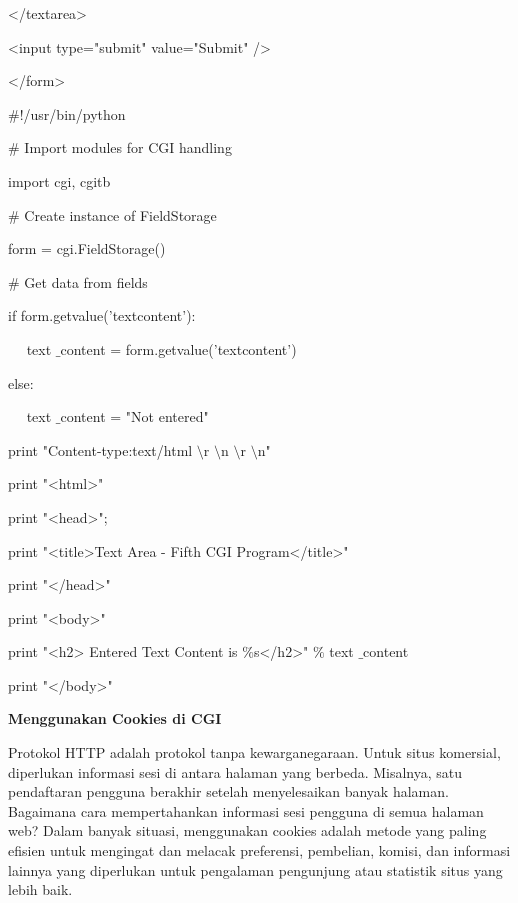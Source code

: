 \noindent 
</textarea> \par
\noindent 
<input type="submit" value="Submit" /> \par
\noindent 
</form> \par
\vspace{12pt}
\noindent 
 $  \#  $!/usr/bin/python \par
\vspace{12pt}
\noindent 
 $  \#  $ Import modules for CGI handling  \par
\noindent 
import cgi, cgitb  \par
\vspace{12pt}
\noindent 
 $  \#  $ Create instance of FieldStorage  \par
\noindent 
form = cgi.FieldStorage()  \par
\vspace{12pt}
\noindent 
 $  \#  $ Get data from fields \par
\noindent 
if form.getvalue('textcontent'): \par
\noindent 
~~ text $  \_  $content = form.getvalue('textcontent') \par
\noindent 
else: \par
\noindent 
~~ text $  \_  $content = "Not entered" \par
\vspace{12pt}
\noindent 
print "Content-type:text/html $  \setminus  $r $  \setminus  $n $  \setminus  $r $  \setminus  $n" \par
\noindent 
print "<html>" \par
\noindent 
print "<head>"; \par
\noindent 
print "<title>Text Area - Fifth CGI Program</title>" \par
\noindent 
print "</head>" \par
\noindent 
print "<body>" \par
\noindent 
print "<h2> Entered Text Content is  $  \%  $s</h2>"  $  \%  $ text $  \_  $content \par
\noindent 
print "</body>" \par
\vspace{12pt}
\noindent 
{\fontsize{14pt}{14pt}\selectfont \textbf{Menggunakan Cookies di CGI} \\} \par
\noindent 
Protokol HTTP adalah protokol tanpa kewarganegaraan. Untuk situs komersial, diperlukan informasi sesi di antara halaman yang berbeda. Misalnya, satu pendaftaran pengguna berakhir setelah menyelesaikan banyak halaman. Bagaimana cara mempertahankan informasi sesi pengguna di semua halaman web? Dalam banyak situasi, menggunakan cookies adalah metode yang paling efisien untuk mengingat dan melacak preferensi, pembelian, komisi, dan informasi lainnya yang diperlukan untuk pengalaman pengunjung atau statistik situs yang lebih baik. \par
